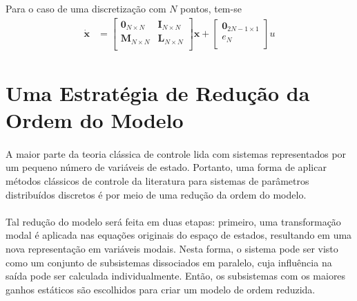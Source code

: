 \documentclass[a4paper,11pt]{scrartcl} %
\numberwithin{equation}{section} %
\numberwithin{figure}{section} %
\numberwithin{table}{section} %
\begin{document}
 Para o caso de uma discretização com $N$ pontos, tem-se \begin{align}
 	\mathbf{\dot{x}} &= \left[\begin{array}{cc}
	\mathbf{0}_{N\times N} & \mathbf{I}_{N\times N}\\
	\mathbf{M}_{N\times N} & \mathbf{L}_{N\times N}\\
\end{array}\right] \mathbf{x} + \left[\begin{array}{c}
	\mathbf{0}_{2N-1\times 1}\\ e_N\\
\end{array} \right]u
 \end{align}
% 
% 
% 

\section{Uma Estratégia de Redução da Ordem do Modelo}
\paragraph{} A maior parte da teoria clássica de controle lida com sistemas representados por um pequeno número de variáveis de estado. Portanto, uma forma de aplicar métodos clássicos de controle da literatura para sistemas de parâmetros distribuídos discretos é por meio de uma redução da ordem do modelo.

\paragraph{} Tal redução do modelo será feita em duas etapas: primeiro, uma transformação modal é aplicada nas equações originais do espaço de estados, resultando em uma nova representação em variáveis modais. Nesta forma, o sistema pode ser visto como um conjunto de subsistemas dissociados em paralelo, cuja influência na saída pode ser calculada individualmente. Então, os subsistemas com os maiores ganhos estáticos são escolhidos para criar um modelo de ordem reduzida.
\end{document}
